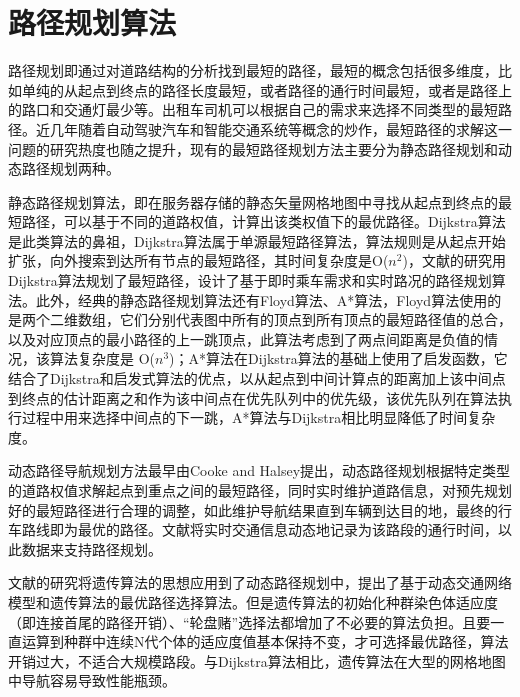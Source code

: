 \section{路径规划算法}
路径规划即通过对道路结构的分析找到最短的路径，最短的概念包括很多维度，比如单纯的从起点到终点的路径长度最短，或者路径的通行时间最短，或者是路径上的路口和交通灯最少等。出租车司机可以根据自己的需求来选择不同类型的最短路径。近几年随着自动驾驶汽车和智能交通系统等概念的炒作，最短路径的求解这一问题的研究热度也随之提升，现有的最短路径规划方法主要分为静态路径规划和动态路径规划两种。\par
静态路径规划算法，即在服务器存储的静态矢量网格地图中寻找从起点到终点的最短路径，可以基于不同的道路权值，计算出该类权值下的最优路径。Dijkstra算法是此类算法的鼻祖，Dijkstra算法属于单源最短路径算法，算法规则是从起点开始扩张，向外搜索到达所有节点的最短路径，其时间复杂度是O($ n^{2} $)，文献的研究用Dijkstra算法规划了最短路径，设计了基于即时乘车需求和实时路况的路径规划算法。此外，经典的静态路径规划算法还有Floyd算法、A*算法，Floyd算法使用的是两个二维数组，它们分别代表图中所有的顶点到所有顶点的最短路径值的总合，以及对应顶点的最小路径的上一跳顶点，此算法考虑到了两点间距离是负值的情况，该算法复杂度是 O($ n^{3} $)；A*算法在Dijkstra算法的基础上使用了启发函数，它结合了Dijkstra和启发式算法的优点，以从起点到中间计算点的距离加上该中间点到终点的估计距离之和作为该中间点在优先队列中的优先级，该优先队列在算法执行过程中用来选择中间点的下一跳，A*算法与Dijkstra相比明显降低了时间复杂度。\par
动态路径导航规划方法最早由Cooke and Halsey提出，动态路径规划根据特定类型的道路权值求解起点到重点之间的最短路径，同时实时维护道路信息，对预先规划好的最短路径进行合理的调整，如此维护导航结果直到车辆到达目的地，最终的行车路线即为最优的路径。文献将实时交通信息动态地记录为该路段的通行时间，以此数据来支持路径规划。\par
文献的研究将遗传算法的思想应用到了动态路径规划中，提出了基于动态交通网络模型和遗传算法的最优路径选择算法。但是遗传算法的初始化种群染色体适应度（即连接首尾的路径开销）、“轮盘赌”选择法都增加了不必要的算法负担。且要一直运算到种群中连续N代个体的适应度值基本保持不变，才可选择最优路径，算法开销过大，不适合大规模路段。与Dijkstra算法相比，遗传算法在大型的网格地图中导航容易导致性能瓶颈。\par

